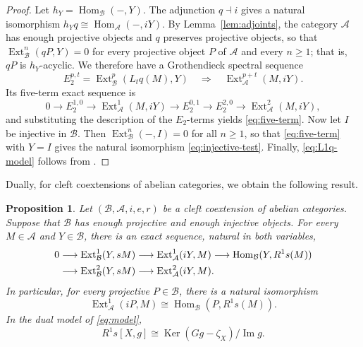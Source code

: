 \documentclass[11pt]{amsart}
\newtheorem{proposition}[theorem]{Proposition}
\theoremstyle{definition}
\theoremstyle{remark}
\theoremstyle{plain}
\numberwithin{equation}{section}
\begin{document}
\begin{proof}
Let $h_Y = \operatorname{Hom}_{\mathcal{B}}(-, Y)$. The adjunction $q \dashv i$ gives a natural
isomorphism $h_Yq \cong \operatorname{Hom}_{\mathcal{A}}(-, iY)$. By Lemma~\ref{lem:adjoints}, the
category $\mathcal{A}$ has enough projective objects and $q$ preserves projective
objects, so that $\operatorname{Ext}^n_{\mathcal{B}}(qP, Y) = 0$ for every projective object $P$
of $\mathcal{A}$ and every $n \geq 1$; that is, $qP$ is $h_Y$-acyclic. We therefore
have a Grothendieck spectral sequence
\[
 E_2^{p, t} = \operatorname{Ext}^p_{\mathcal{B}}(L_tq(M), Y)
 \quad\Longrightarrow\quad
 \operatorname{Ext}^{p+t}_{\mathcal{A}}(M, iY).
\]
Its five-term exact sequence is
\[
 0 \longrightarrow E_2^{1, 0}
\longrightarrow \operatorname{Ext}^1_{\mathcal{A}}(M, iY)
\longrightarrow E_2^{0, 1}
\longrightarrow E_2^{2, 0}
\longrightarrow \operatorname{Ext}^2_{\mathcal{A}}(M, iY),
\]
and substituting the description of the $E_2$-terms yields
\eqref{eq:five-term}. Now let $I$ be injective in $\mathcal{B}$. Then
$\operatorname{Ext}^n_{\mathcal{B}}(-, I) = 0$ for all $n \geq 1$, so that \eqref{eq:five-term}
with $Y = I$ gives the natural isomorphism \eqref{eq:injective-test}.
Finally, \eqref{eq:L1q-model} follows from
\cite[Corollary~5.10(i)]{BelCleft}.

\end{proof}

Dually, for cleft coextensions of abelian categories, we obtain the following result.
\begin{proposition}\label{prop:low-degree-dual}
	Let $(\mathcal{B},\mathcal{A},i,e,r)$ be a cleft coextension of abelian categories.
	Suppose that $\mathcal{B}$ has enough projective and enough injective objects. For every $M\in\mathcal{A}$ and $Y\in\mathcal{B}$, there is an exact sequence, natural in both variables,
	\begin{align}
		0 & \longrightarrow \operatorname{Ext}^1_{\mathcal{B}}(Y, sM)
		\longrightarrow \operatorname{Ext}^1_{\mathcal{A}}(iY, M)
		\longrightarrow \operatorname{Hom}_{\mathcal{B}}(Y, R^1s(M)) \notag\\
		& \longrightarrow \operatorname{Ext}^2_{\mathcal{B}}(Y, sM)
		\longrightarrow \operatorname{Ext}^2_{\mathcal{A}}(iY, M).
		\label{eq:five-term-dual}
	\end{align}
	In particular, for every projective $P \in \mathcal{B}$, there is a natural isomorphism
	\begin{equation}\label{eq:projective-test}
		\operatorname{Ext}^1_{\mathcal{A}}(iP, M) \cong \operatorname{Hom}_{\mathcal{B}}(P, R^1s(M)).
	\end{equation}
	In the dual model of \eqref{eq:model},
	\begin{equation}\label{eq:R1s-model}
		R^1s[X, g] \cong
		\operatorname{Ker}(Gg-\zeta_X)/\operatorname{Im} g.
	\end{equation}
\end{proposition}
\end{document}
